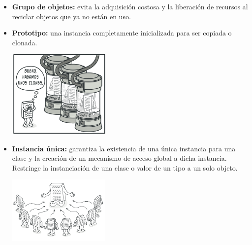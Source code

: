 \documentclass[twoside,twocolumn]{article}
\begin{document}
\begin{itemize}
\begin{itemize}
		\item \textbf{Grupo de objetos:}	evita la adquisición costosa y la liberación de recursos al reciclar objetos que ya no están en uso.
		\item \textbf{Prototipo:} una instancia completamente inicializada para ser copiada o clonada.
		\begin{center}
			\includegraphics[width=5cm]{./Imagenes/5} 
		\end{center}
		
		\item \textbf{Instancia única:} garantiza la existencia de una única instancia para una clase y la creación de un mecanismo de acceso global a dicha instancia. Restringe la instanciación de una clase o valor de un tipo a un solo objeto.
		\begin{center}
			\includegraphics[width=5cm]{./Imagenes/6} 
		\end{center}
		
	\end{itemize}
	

\end{itemize}
\end{document}
